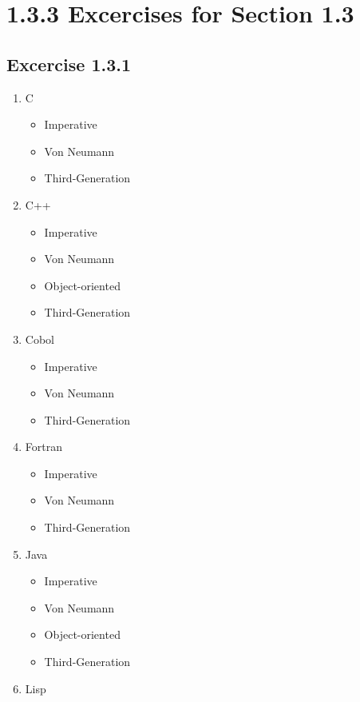 \documentclass{article}
\begin{document}
\section*{1.3.3 Excercises for Section 1.3}

\subsection*{Excercise 1.3.1}
\begin{enumerate}
    \item C
    \begin{itemize}
        \item Imperative
        \item Von Neumann
        \item Third-Generation
    \end{itemize}
    \item C++
    \begin{itemize}
        \item Imperative
        \item Von Neumann
        \item Object-oriented 
        \item Third-Generation
    \end{itemize}
    \item Cobol 
    \begin{itemize}
        \item Imperative
        \item Von Neumann
        \item Third-Generation
    \end{itemize}
    \item Fortran
    \begin{itemize}
        \item Imperative
        \item Von Neumann
        \item Third-Generation
    \end{itemize}
    \item Java
    \begin{itemize}
        \item Imperative
        \item Von Neumann
        \item Object-oriented 
        \item Third-Generation
    \end{itemize}
    \item Lisp
    \begin{itemize}

\end{itemize}
\end{enumerate}
\end{document}
